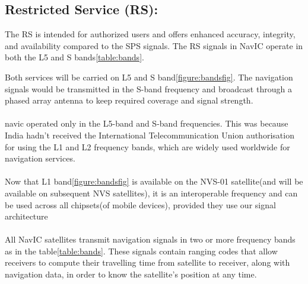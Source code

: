 \subsection{Restricted Service (RS):}
The RS is intended for authorized users and offers enhanced accuracy, integrity, and availability compared to the SPS signals. The RS signals in NavIC operate in both the L5 and S bands\ref{table:bands}.	

	
Both services will be carried on L5 and S band\ref{figure:bandsfig}. The navigation signals would be transmitted in the S-band frequency and broadcast through a phased array antenna to keep required coverage and signal strength.
\\
\\
navic operated only in the L5-band and S-band frequencies. This was because India hadn't received the International Telecommunication Union authorisation for using the L1 and L2 frequency bands, which are widely used worldwide for navigation services.
\\
\\
Now that L1 band\ref{figure:bandsfig} is available on the NVS-01 satellite(and will be available on subsequent NVS satellites), it is an interoperable frequency and can be used across all chipsets(of mobile devices), provided they use our signal architecture
\\
\\
All NavIC satellites transmit navigation signals in two or more frequency bands as in the table\ref{table:bands}. These signals contain ranging codes that allow receivers to compute their travelling time from satellite to receiver, along with navigation data, in order to know the satellite’s position at any time. 
%
